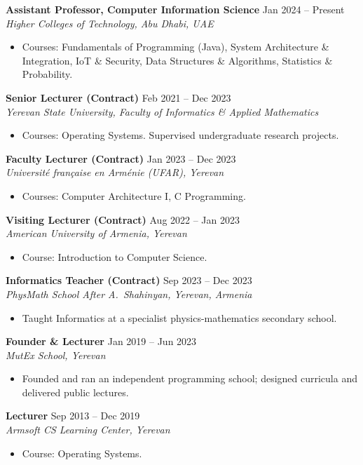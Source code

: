 \documentclass[a4paper,12pt]{article}
\newcommand{\role}[3]{%
  \par\vspace{7pt}\noindent\textbf{#1} \hfill \small\textnormal{#2} \\
  \textit{\small #3}\par\vspace{3pt}%
}
\begin{document}
\role{Assistant Professor, Computer Information Science}{Jan 2024 -- Present}{Higher Colleges of Technology, Abu Dhabi, UAE}
\begin{itemize}[leftmargin=*, noitemsep, topsep=0pt]
  \item Courses: Fundamentals of Programming (Java), System Architecture \& Integration, IoT \& Security,
        Data Structures \& Algorithms, Statistics \& Probability.
\end{itemize}

\role{Senior Lecturer (Contract)}{Feb 2021 -- Dec 2023}{Yerevan State University, Faculty of Informatics \& Applied Mathematics}
\begin{itemize}[leftmargin=*, noitemsep, topsep=0pt]
  \item Courses: Operating Systems. Supervised undergraduate research projects.
\end{itemize}

\role{Faculty Lecturer (Contract)}{Jan 2023 -- Dec 2023}{Université française en Arménie (UFAR), Yerevan}
\begin{itemize}[leftmargin=*, noitemsep, topsep=0pt]
  \item Courses: Computer Architecture I, C Programming.
\end{itemize}

\role{Visiting Lecturer (Contract)}{Aug 2022 -- Jan 2023}{American University of Armenia, Yerevan}
\begin{itemize}[leftmargin=*, noitemsep, topsep=0pt]
  \item Course: Introduction to Computer Science.
\end{itemize}

\role{Informatics Teacher (Contract)}{Sep 2023 -- Dec 2023}{PhysMath School After A.~Shahinyan, Yerevan, Armenia}
\begin{itemize}[leftmargin=*, noitemsep, topsep=0pt]
  \item Taught Informatics at a specialist physics-mathematics secondary school.
\end{itemize}

\role{Founder \& Lecturer}{Jan 2019 -- Jun 2023}{MutEx School, Yerevan}
\begin{itemize}[leftmargin=*, noitemsep, topsep=0pt]
  \item Founded and ran an independent programming school; designed curricula and delivered public lectures.
\end{itemize}

\role{Lecturer}{Sep 2013 -- Dec 2019}{Armsoft CS Learning Center, Yerevan}
\begin{itemize}[leftmargin=*, noitemsep, topsep=0pt]
  \item Course: Operating Systems.
\end{itemize}
\end{document}
